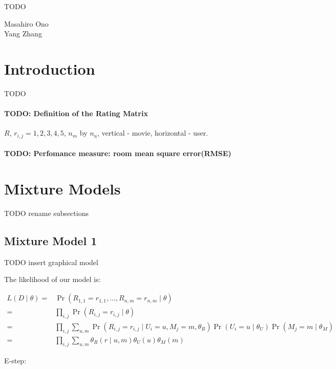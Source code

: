 \documentclass{article}
\newcommand{\PO}[1]{{ \Pr \left( #1 \right) }}
\newcommand{\PP}[2]{{ \PO{ #1 \mid #2 } }}
\begin{document}
TODO

Masahiro Ono \\
Yang  Zhang

\section{Introduction}

TODO
\paragraph{TODO: Definition of the Rating Matrix}
$R$, $r_{i,j}={1,2,3,4,5}$, $n_m$ by $n_u$, vertical - movie, horizontal - user. 

\paragraph{TODO: Perfomance measure: room mean square error(RMSE)}

\section{Mixture Models}

TODO rename subsections

\subsection{Mixture Model 1}

TODO insert graphical model

The likelihood of our model is:

\begin{align*}
  L \left( D \mid \theta \right)
  =& \PP{ R_{1,1} = r_{1,1}, \dots, R_{n,m} = r_{n,m} }{ \theta } \\
  =& \prod_{i,j} \PP{ R_{i,j} = r_{i,j} }{ \theta } \\
  =& \prod_{i,j} \sum_{u,m}
  \PP{ R_{i,j} = r_{i,j} }{ U_i = u, M_j = m, \theta_R }
  \PP{ U_i = u }{ \theta_U }
  \PP{ M_j = m }{ \theta_M } \\
  =& \prod_{i,j} \sum_{u,m} \theta_R(r \mid u,m) \theta_U(u) \theta_M(m)
\end{align*}

E-step:
\end{document}
